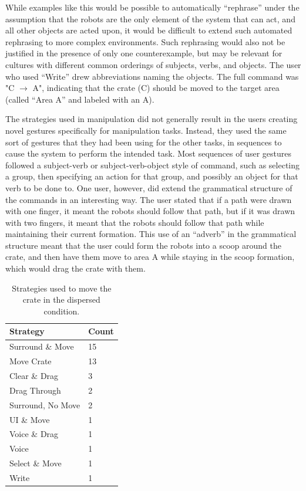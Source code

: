 While examples like this would be possible to automatically ``rephrase'' under the assumption that the robots are the only element of the system that can act, and all other objects are acted upon, it would be difficult to extend such automated rephrasing to more complex environments. 
Such rephrasing would also not be justified in the presence of only one counterexample, but may be relevant for cultures with different common orderings of subjects, verbs, and objects. 
The user who used ``Write'' drew abbreviations naming the objects. The full command was "C $\rightarrow$ A", indicating that the crate (C) should be moved to the target area (called ``Area A'' and labeled with an A).

The strategies used in manipulation did not generally result in the users creating novel gestures specifically for manipulation tasks. 
Instead, they used the same sort of gestures that they had been using for the other tasks, in sequences to cause the system to perform the intended task. 
Most sequences of user gestures followed a subject-verb or subject-verb-object style of command, such as selecting a group, then specifying an action for that group, and possibly an object for that verb to be done to.
One user, however, did extend the grammatical structure of the commands in an interesting way. 
The user stated that if a path were drawn with one finger, it meant the robots should follow that path, but if it was drawn with two fingers, it meant that the robots should follow that path while maintaining their current formation. 
This use of an ``adverb'' in the grammatical structure meant that the user could form the robots into a scoop around the crate, and then have them move to area A while staying in the scoop formation, which would drag the crate with them. 

\begin{table}
	\begin{tabular}{l l}
		Strategy & Count\\
		\hline
		Surround \& Move & 15\\
		Move Crate & 13\\
		Clear \& Drag & 3\\
		Drag Through & 2\\
		Surround, No Move & 2\\
		UI \& Move & 1\\
		Voice \& Drag & 1\\
		Voice & 1\\
		Select \& Move & 1 \\
		Write & 1\\
	\end{tabular}
	\caption{Strategies used to move the crate in the dispersed condition.}
	\label{tab:dispersed_crate_strategies}
\end{table}

